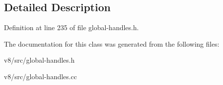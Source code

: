 \subsection{Detailed Description}


Definition at line 235 of file global-\/handles.\+h.



The documentation for this class was generated from the following files\+:\begin{DoxyCompactItemize}
\item 
v8/src/global-\/handles.\+h\item 
v8/src/global-\/handles.\+cc\end{DoxyCompactItemize}
